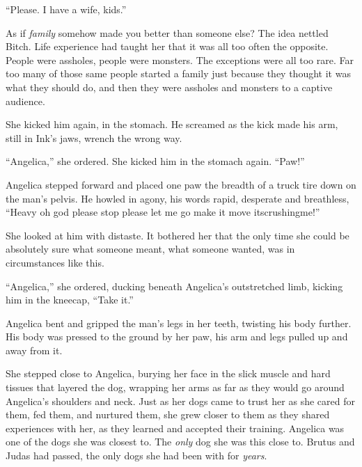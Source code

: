 ``Please.  I have a wife, kids.''



As if \emph{family} somehow made you better than someone else?  The idea nettled Bitch.  Life experience had taught her that it was all too often the opposite.  People were assholes, people were monsters.  The exceptions were all too rare.  Far too many of those same people started a family just because they thought it was what they should do, and then they were assholes and monsters to a captive audience.



She kicked him again, in the stomach.  He screamed as the kick made his arm, still in Ink's jaws, wrench the wrong way.



``Angelica,'' she ordered.  She kicked him in the stomach again.  ``Paw!''



Angelica stepped forward and placed one paw the breadth of a truck tire down on the man's pelvis.  He howled in agony, his words rapid, desperate and breathless, ``Heavy oh god please stop please let me go make it move itscrushingme!''



She looked at him with distaste.  It bothered her that the only time she could be absolutely sure what someone meant, what someone wanted, was in circumstances like this.



``Angelica,'' she ordered, ducking beneath Angelica's outstretched limb, kicking him in the kneecap, ``Take it.''



Angelica bent and gripped the man's legs in her teeth, twisting his body further.  His body was pressed to the ground by her paw, his arm and legs pulled up and away from it.



She stepped close to Angelica, burying her face in the slick muscle and hard tissues that layered the dog, wrapping her arms as far as they would go around Angelica's shoulders and neck.  Just as her dogs came to trust her as she cared for them, fed them, and nurtured them, she grew closer to them as they shared experiences with her, as they learned and accepted their training.  Angelica was one of the dogs she was closest to.  The \emph{only} dog she was this close to.  Brutus and Judas had passed, the only dogs she had been with for \emph{years}.



